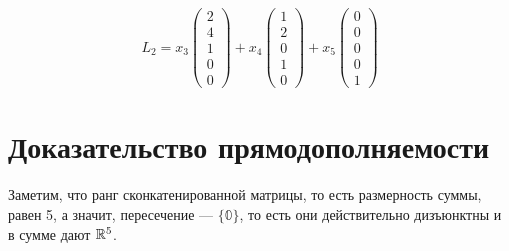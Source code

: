 \documentclass[12pt, a4paper]{article}
\begin{document}
    \begin{equation}
        L_2 = x_3 \left(\begin{matrix}
            2 \\
            4 \\
            1 \\
            0 \\
            0
        \end{matrix}\right) + x_4 \left(\begin{matrix}
            1 \\
            2 \\
            0 \\
            1 \\
            0
            \end{matrix}\right) + x_5 \begin{pmatrix}
            0 \\ 0\\0\\0\\1
        \end{pmatrix}
    \end{equation}

    \section{Доказательство прямодополняемости}
    Заметим, что ранг сконкатенированной матрицы, 
    то есть размерность суммы, равен 5, 
    а значит, пересечение — $\{\mathbb{0}\}$, 
    то есть они действительно дизъюнктны и в сумме дают ${\mathbb{R}}^5$.
\end{document}
